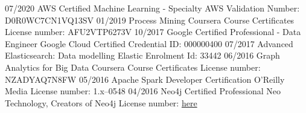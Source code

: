 \documentclass[]{../../friggeri-cv}
\begin{document}
\begin{entrylist2}
    \entrytwo
        {\small 07/2020}
        {\small AWS Certified Machine Learning - Specialty}
        {\small AWS}
        {\small Validation Number: D0R0WC7CN1VQ13SV}
    \entrytwo
        {\small 01/2019}
        {\small Process Mining}
        {\small Coursera Course Certificates}
        {\small License number: AFU2VTP6273V}
    \entrytwo
        {\small 10/2017}
        {\small Google Certified Professional - Data Engineer}
        {\small Google Cloud Certified}
        {\small Credential ID: 000000400}
    \entrytwo
        {\small 07/2017}
        {\small Advanced Elasticsearch: Data modelling}
        {\small Elastic}
        {\small Enrolment Id: 33442}
    \entrytwo
        {\small 06/2016}
        {\small Graph Analytics for Big Data}
        {\small Coursera Course Certificates}
        {\small License number: NZADYAQ7N8FW}
    \entrytwo
        {\small 05/2016}
        {\small Apache Spark Developer Certification}
        {\small O'Reilly Media}
        {\small License number: 1.x--0548}
    \entrytwo
        {\small 04/2016}
        {\small Neo4j Certified Professional}
        {\small Neo Technology, Creators of Neo4j}
        {\small License number: \href{https://drive.google.com/open?id=1ol67OnuuWBmrIeJPbvLNOOiQC8K0pXb_}{here}}
\end{entrylist2}
\end{document}
